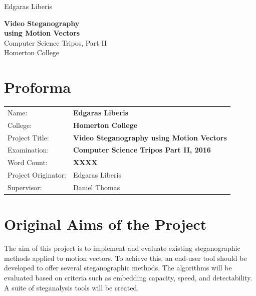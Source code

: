 \documentclass[12pt,british,twoside,notitlepage,usenames,dvipsnames,hypens,final]{report}
\numberwithin{equation}{section}
\numberwithin{figure}{section}
\begin{document}
\pagestyle{empty}

\hfill{\LARGE Edgaras Liberis}

\vspace*{60mm}
\begin{center}
\Huge
{\bf Video Steganography \\ using Motion Vectors} \\
\vspace*{10mm}
{ \sc \LARGE
Computer Science Tripos, Part II \\
Homerton College \\
}
\vspace*{10mm}
\the\year 
\end{center}

\cleardoublepage

\setcounter{page}{3}
\pagestyle{plain}

{\section*{\Huge Proforma}}

{\large
\begin{tabular}{ll}
Name:               & \bf Edgaras Liberis                          \\
College:            & \bf Homerton College                         \\
Project Title:      & \bf Video Steganography using Motion Vectors \\
Examination:        & \bf Computer Science Tripos Part II, 2016    \\
Word Count:         & \bf XXXX\footnotemark[1]                     \\
Project Originator: & Edgaras Liberis                              \\
Supervisor:         & Daniel Thomas                                \\ 
\end{tabular}
}
\vspace{0.5cm}

\section*{Original Aims of the Project}

The aim of this project is to implement and evaluate existing steganographic methods applied to motion vectors. To achieve this, an end-user tool should be developed to offer several steganographic methods. The algorithms will be evaluated based on criteria such as embedding capacity, speed, and detectability. A suite of steganalysis tools will be created.   
\end{document}
